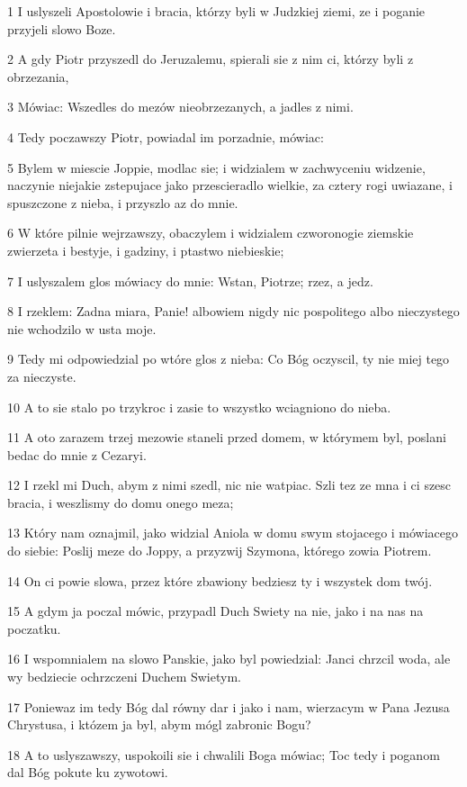 \par 1 I uslyszeli Apostolowie i bracia, którzy byli w Judzkiej ziemi, ze i poganie przyjeli slowo Boze.
\par 2 A gdy Piotr przyszedl do Jeruzalemu, spierali sie z nim ci, którzy byli z obrzezania,
\par 3 Mówiac: Wszedles do mezów nieobrzezanych, a jadles z nimi.
\par 4 Tedy poczawszy Piotr, powiadal im porzadnie, mówiac:
\par 5 Bylem w miescie Joppie, modlac sie; i widzialem w zachwyceniu widzenie, naczynie niejakie zstepujace jako przescieradlo wielkie, za cztery rogi uwiazane, i spuszczone z nieba, i przyszlo az do mnie.
\par 6 W które pilnie wejrzawszy, obaczylem i widzialem czworonogie ziemskie zwierzeta i bestyje, i gadziny, i ptastwo niebieskie;
\par 7 I uslyszalem glos mówiacy do mnie: Wstan, Piotrze; rzez, a jedz.
\par 8 I rzeklem: Zadna miara, Panie! albowiem nigdy nic pospolitego albo nieczystego nie wchodzilo w usta moje.
\par 9 Tedy mi odpowiedzial po wtóre glos z nieba: Co Bóg oczyscil, ty nie miej tego za nieczyste.
\par 10 A to sie stalo po trzykroc i zasie to wszystko wciagniono do nieba.
\par 11 A oto zarazem trzej mezowie staneli przed domem, w którymem byl, poslani bedac do mnie z Cezaryi.
\par 12 I rzekl mi Duch, abym z nimi szedl, nic nie watpiac. Szli tez ze mna i ci szesc bracia, i weszlismy do domu onego meza;
\par 13 Który nam oznajmil, jako widzial Aniola w domu swym stojacego i mówiacego do siebie: Poslij meze do Joppy, a przyzwij Szymona, którego zowia Piotrem.
\par 14 On ci powie slowa, przez które zbawiony bedziesz ty i wszystek dom twój.
\par 15 A gdym ja poczal mówic, przypadl Duch Swiety na nie, jako i na nas na poczatku.
\par 16 I wspomnialem na slowo Panskie, jako byl powiedzial: Janci chrzcil woda, ale wy bedziecie ochrzczeni Duchem Swietym.
\par 17 Poniewaz im tedy Bóg dal równy dar i jako i nam, wierzacym w Pana Jezusa Chrystusa, i któzem ja byl, abym mógl zabronic Bogu?
\par 18 A to uslyszawszy, uspokoili sie i chwalili Boga mówiac; Toc tedy i poganom dal Bóg pokute ku zywotowi.
